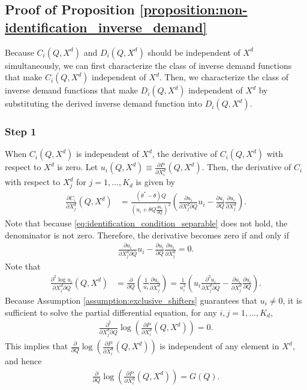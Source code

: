 \documentclass[11pt, a4paper]{article}
\theoremstyle{remark}
\begin{document}
\subsection{Proof of Proposition \ref{proposition:non-identification_inverse_demand}}


Because $C_i(Q, X^{d})$ and $D_i(Q, X^{d})$ should be independent of $X^{d}$ simultaneously, we can first characterize the class of inverse demand functions that make $C_i(Q, X^{d})$ independent of $X^{d}$.
Then, we characterize the class of inverse demand functions that make $D_i(Q, X^{d})$ independent of $X^{d}$ by substituting the derived inverse demand function into $D_i(Q, X^{d})$.

\subsubsection*{Step 1}
When $C_i(Q, X^{d})$ is independent of $X^{d}$, the derivative of $C_i(Q, X^{d})$ with respect to $X^{d}$ is zero.
Let $u_i(Q, X^{d}) \equiv \frac{\partial P}{\partial X^{d}_i}(Q, X^{d})$.
Then, the derivative of $C_i$ with respect to $X^{d}_j$ for $j = 1, \ldots, K_d$ is given by
\begin{align}
    \frac{\partial C_i}{\partial X^{d}_j}(Q, X^{d}) & = \frac{(\theta^{*} - \theta)Q }{\left(u_i + \theta Q \frac{\partial u_i}{\partial Q}\right)^2}\left(\frac{\partial u_i}{\partial X^{d}_j\partial Q} u_i - \frac{\partial u_i}{\partial Q} \frac{\partial u_i}{\partial X^{d}_j}\right).
\end{align}
Note that because \eqref{eq:identification_condition_separable} does not hold, the denominator is not zero.
Therefore, the derivative becomes zero if and only if
\begin{align}
    \frac{\partial u_i}{\partial X^{d}_j\partial Q} u_i - \frac{\partial u_i}{\partial Q} \frac{\partial u_i}{\partial X^{d}_j} = 0.
\end{align}
Note that 
\begin{align}
    \frac{\partial^2 \log u_i}{\partial X^{d}_j \partial Q}(Q, X^{d}) & = \frac{\partial }{\partial Q}\left(\frac{1}{u_i}\frac{\partial u_i}{\partial X^{d}_j}\right) = \frac{1}{u_i^2}\left(u_i\frac{\partial^2 u_i}{\partial X^{d}_j \partial Q} - \frac{\partial u_i}{\partial X^{d}_j}\frac{\partial u_i}{\partial Q}\right).
\end{align}
Because Assumption \ref{assumption:exclusive_shifters} guarantees that $u_i \ne 0$, it is sufficient to solve the partial differential equation, for any $i,j = 1, \ldots, K_d$,
\begin{align}
    \frac{\partial^2 }{\partial X^{d}_j \partial Q}\log \left(\frac{\partial P}{\partial X^{d}_i}(Q, X^{d})\right) = 0.
\end{align}
This implies that $\frac{\partial }{\partial Q}\log \left(\frac{\partial P}{\partial X^{d}_i}(Q, X^{d})\right)$ is independent of any element in $X^{d}$, and hence
\begin{align}
    \frac{\partial }{\partial Q}\log \left(\frac{\partial P}{\partial X^{d}_i}(Q, X^{d})\right) = G(Q).
\end{align}
\end{document}

